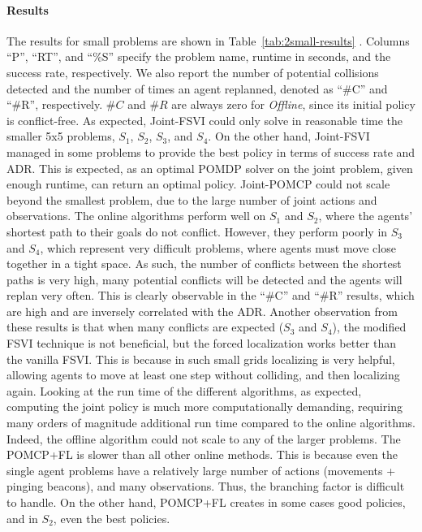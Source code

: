 \documentclass[letterpaper]{article} %
\begin{document}
\paragraph{Results}
The results for small problems are shown in Table~\ref{tab:2small-results} .
Columns ``P'', ``RT'', and ``\%S'' specify the problem name, runtime in seconds, and the success rate, respectively.
We also report the number of potential collisions detected and the number of times an agent replanned, denoted as ``\#C'' and ``\#R'', respectively.
$\#C$ and $\#R$ are always zero for \emph{Offline}, since its initial policy is conflict-free. %
As expected, Joint-FSVI could only solve in reasonable time the smaller 5x5 problems, $S_1$, $S_2$, $S_3$, and $S_4$. On the other hand, Joint-FSVI managed in some problems to provide the best policy in terms of success rate and ADR. This is expected, as an optimal POMDP solver on the joint problem, given enough runtime, can return an optimal policy. Joint-POMCP could not scale beyond  the smallest problem, due to the large number of joint actions and observations.
The online algorithms perform well on $S_1$ and $S_2$, where the agents' shortest path to their goals do not conflict.
However, they perform poorly in $S_3$ and $S_4$, which represent very difficult problems, where agents must move close together in a tight space. As such, the number of conflicts between the shortest paths is very high, many potential conflicts will be detected and the agents will replan very often. This is clearly observable in the ``\#C'' and ``\#R'' results, which are high and are inversely correlated with the ADR.
Another observation from these results is that when many conflicts are expected ($S_3$ and $S_4$), the modified FSVI technique is not beneficial, but the forced localization works better than the vanilla FSVI.
This is because in such small grids localizing is very helpful, allowing agents to move at least one step without colliding, and then localizing again.
Looking at the run time of the different algorithms, as expected, computing the joint policy is much more computationally demanding, requiring many orders of magnitude additional run time compared to the online algorithms. Indeed, the offline algorithm could not scale to any of the larger problems.
The POMCP+FL is slower than all other online methods. This is because even the single agent problems have a relatively large number of actions (movements + pinging beacons), and many observations. Thus, the branching factor is difficult to handle. On the other hand, POMCP+FL creates in some cases good policies, and in $S_2$, even the best policies.
\end{document}
